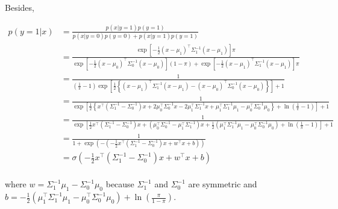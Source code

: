 \documentclass[a4paper, 11pt]{article}
\begin{document}
Besides,

\begin{equation*}
    \begin{aligned}
    p \left( y = 1 | x \right) &= \frac{p \left( x | y = 1 \right) p ( y = 1 )}{p(x | y = 0) p(y = 0) + p(x | y = 1) p(y = 1)} \\
    &= \frac{\exp \left[ - \frac{1}{2} \left( x - \mu_{1} \right)^\top \Sigma^{-1}_1 \left( x - \mu_{1} \right) \right] \pi}{\exp \left[ - \frac{1}{2} \left( x - \mu_{0} \right)^\top \Sigma^{-1}_0 \left( x - \mu_{0} \right) \right] \left( 1 - \pi \right) + \exp \left[ - \frac{1}{2} \left( x - \mu_{1} \right)^\top \Sigma^{-1}_1 \left( x - \mu_{1} \right) \right] \pi} \\
    &= \frac{1}{\left( \frac{1}{\pi} - 1 \right) \exp \left[ \frac{1}{2} \left\{ \left( x - \mu_{1} \right)^\top \Sigma^{-1}_1 \left( x - \mu_{1} \right) - \left( x - \mu_{0} \right)^\top \Sigma^{-1}_0 \left( x - \mu_{0} \right) \right\} \right] + 1} \\
    &= \frac{1}{\exp \left[ \frac{1}{2} \left\{ x^\top \left(\Sigma^{-1}_1 - \Sigma^{-1}_0 \right) x + 2 \mu_{0}^\top \Sigma^{-1}_0 x - 2 \mu_{1}^\top \Sigma^{-1}_1 x + \mu_{1}^\top \Sigma^{-1}_1 \mu_{1} - \mu_{0}^\top \Sigma^{-1}_0 \mu_{0} \right\} + \ln \left( \frac{1}{\pi} - 1 \right) \right] + 1} \\
    &= \frac{1}{\exp \left[ \frac{1}{2}  x^\top \left(\Sigma^{-1}_1 - \Sigma^{-1}_0 \right) x + \left( \mu_{0}^\top \Sigma^{-1}_0 - \mu_{1}^\top \Sigma^{-1}_1 \right) x + \frac{1}{2} \left( \mu_{1}^\top \Sigma^{-1}_1 \mu_{1} - \mu_{0}^\top \Sigma^{-1}_0 \mu_{0} \right)  + \ln \left( \frac{1}{\pi} - 1 \right) \right] + 1} \\
    &= \frac{1}{1 + \exp \left( -( - \frac{1}{2}  x^\top \left(\Sigma^{-1}_1 - \Sigma^{-1}_0 \right) x + w^\top x + b) \right)} \\
    &= \sigma \left( - \frac{1}{2}  x^\top \left(\Sigma^{-1}_1 - \Sigma^{-1}_0 \right) x + w^\top x + b \right) \\
    \end{aligned}
\end{equation*}

where $w = \Sigma^{-1}_1 \mu_{1} - \Sigma^{-1}_0 \mu_{0} $ because $\Sigma^{-1}_1$ and $\Sigma^{-1}_0$ are symmetric and $b = -\frac{1}{2} \left( \mu_{1}^\top \Sigma^{-1}_1 \mu_{1} - \mu_{0}^\top \Sigma^{-1}_0 \mu_{0} \right) + \ln \left(\frac{\pi}{1-\pi}\right)$.
\end{document}
